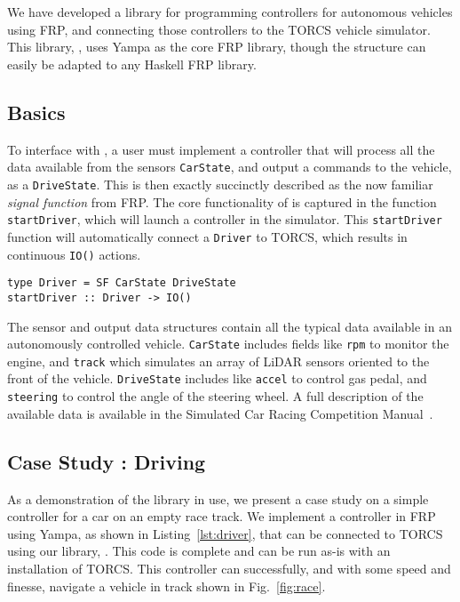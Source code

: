 \section{\ourLib}


We have developed a library for programming controllers for autonomous vehicles using FRP, and connecting those controllers to the TORCS vehicle simulator.
This library, \ourLib, uses Yampa as the core FRP library, though the structure can easily be adapted to any Haskell FRP library.

\subsection{Basics}

To interface with \ourLib, a user must implement a controller that will process all the data available from the sensors \texttt{CarState}, and output a commands to the vehicle, as a \texttt{DriveState}.
This is then exactly succinctly described as the now familiar \textit{signal function} from FRP.
The core functionality of \ourLib is captured in the function \texttt{startDriver}, which will launch a controller in the simulator.
This \texttt{startDriver} function will automatically connect a \texttt{Driver} to TORCS, which results in continuous \texttt{IO()} actions.

\begin{lstlisting}
type Driver = SF CarState DriveState
startDriver :: Driver -> IO()
\end{lstlisting}

The sensor and output data structures contain all the typical data available in an autonomously controlled vehicle.
\texttt{CarState} includes fields like \texttt{rpm} to monitor the engine, and \texttt{track} which simulates an array of LiDAR sensors oriented to the front of the vehicle.
\texttt{DriveState} includes like \texttt{accel} to control gas pedal, and \texttt{steering} to control the angle of the steering wheel.
A full description of the available data is available in the Simulated Car Racing Competition Manual~\cite{SCRCManual}. 

\subsection{Case Study : Driving}

As a demonstration of the \ourLib library in use, we present a case study on a simple controller for a car on an empty race track.
We implement a controller in FRP using Yampa, as shown in Listing~\ref{lst:driver}, that can be connected to TORCS using our library, \ourLib.
This code is complete and can be run as-is with an installation of TORCS.
This controller can successfully, and with some speed and finesse, navigate a vehicle in track shown in Fig.~\ref{fig:race}.

